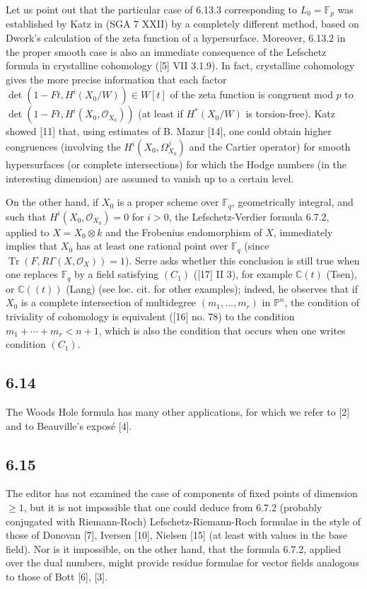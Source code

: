 \documentclass[11pt]{article}
\providecommand{\OO}{\mathcal{O}}
\begin{document}
Let us point out that the particular case of 6.13.3 corresponding to $L_0=\mathbb F_p$ was established by Katz in (SGA 7 XXII) by a completely different method, based on Dwork's calculation of the zeta function of a hypersurface. Moreover, 6.13.2 in the proper smooth case is also an immediate consequence of the Lefschetz formula in crystalline cohomology ([5] VII 3.1.9). In fact, crystalline cohomology gives the more precise information that each factor $\det(1-Ft,H^i(X_0/W))\in W[t]$ of the zeta function is congruent mod $p$ to $\det(1-Ft,H^i(X_0,\OO_{X_0}))$ (at least if $H^*(X_0/W)$ is torsion-free). Katz showed [11] that, using estimates of B. Mazur [14], one could obtain higher congruences (involving the $H^i(X_0,\Omega^j_{X_0})$ and the Cartier operator) for smooth hypersurfaces (or complete intersections) for which the Hodge numbers (in the interesting dimension) are assumed to vanish up to a certain level.

On the other hand, if $X_0$ is a proper scheme over $\mathbb F_q$, geometrically integral, and such that $H^i(X_0,\OO_{X_0})=0$ for $i>0$, the Lefschetz-Verdier formula 6.7.2, applied to $X=X_0\otimes k$ and the Frobenius endomorphism of $X$, immediately implies that $X_0$ has at least one rational point over $\mathbb F_q$ (since $\operatorname{Tr}(F,R\Gamma(X,\OO_X))=1$). Serre asks whether this conclusion is still true when one replaces $\mathbb F_q$ by a field satisfying $(C_1)$ ([17] II 3), for example $\mathbb C(t)$ (Tsen), or $\mathbb C((t))$ (Lang) (see loc. cit. for other examples); indeed, he observes that if $X_0$ is a complete intersection of multidegree $(m_1,\ldots,m_r)$ in $\mathbb P^n$, the condition of triviality of cohomology is equivalent ([16] no. 78) to the condition $m_1+\cdots+m_r<n+1$, which is also the condition that occurs when one writes condition $(C_1)$.

\subsection*{6.14}
The Woods Hole formula has many other applications, for which we refer to [2] and to Beauville's exposé [4].


\subsection*{6.15}

The editor has not examined the case of components of fixed points of dimension $\geq1$, but it is not impossible that one could deduce from 6.7.2 (probably conjugated with Riemann-Roch) Lefschetz-Riemann-Roch formulae in the style of those of Donovan [7], Iversen [10], Nielsen [15] (at least with values in the base field). Nor is it impossible, on the other hand, that the formula 6.7.2, applied over the dual numbers, might provide residue formulae for vector fields analogous to those of Bott [6], [3].
\end{document}
